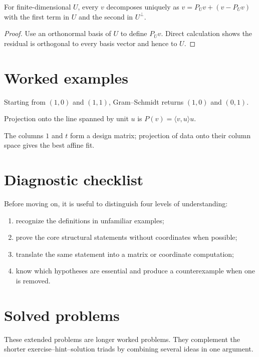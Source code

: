 \begin{theorem}\label{thm:i14-02}
For finite-dimensional $U$, every $v$ decomposes uniquely as $v=P_Uv+(v-P_Uv)$ with the first term in $U$ and the second in $U^\perp$.
\begin{proof}
Use an orthonormal basis of $U$ to define $P_Uv$. Direct calculation shows the residual is orthogonal to every basis vector and hence to $U$.
\end{proof}
\end{theorem}

\section{Worked examples}

\begin{example}\label{ex:i14-worked-01}
Starting from $(1,0)$ and $(1,1)$, Gram–Schmidt returns $(1,0)$ and $(0,1)$.
\end{example}

\begin{example}\label{ex:i14-worked-02}
Projection onto the line spanned by unit $u$ is $P(v)=\langle v,u\rangle u$.
\end{example}

\begin{example}\label{ex:i14-worked-03}
The columns $1$ and $t$ form a design matrix; projection of data onto their column space gives the best affine fit.
\end{example}

\section{Diagnostic checklist}
Before moving on, it is useful to distinguish four levels of understanding:
\begin{enumerate}
\item recognize the definitions in unfamiliar examples;
\item prove the core structural statements without coordinates when possible;
\item translate the same statement into a matrix or coordinate computation;
\item know which hypotheses are essential and produce a counterexample when one is removed.
\end{enumerate}

\section{Solved problems}
These extended problems are longer worked problems. They complement the shorter exercise--hint--solution triads by combining several ideas in one argument.

